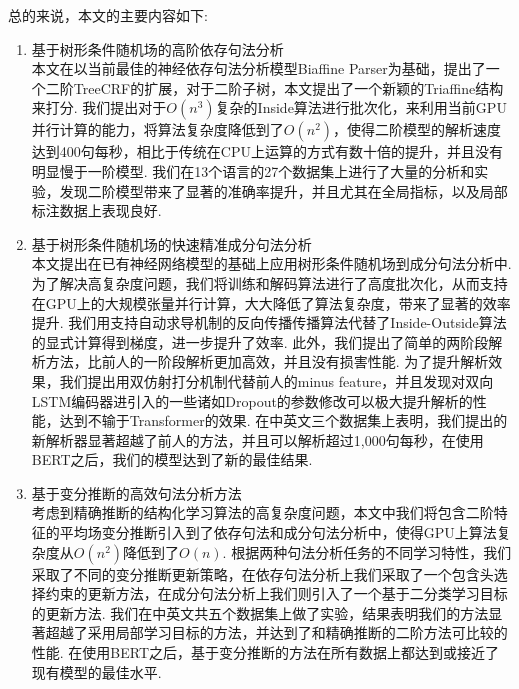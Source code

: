 总的来说，本文的主要内容如下:
\begin{enumerate}
    \item 基于树形条件随机场的高阶依存句法分析\\
          \indent 本文在以当前最佳的神经依存句法分析模型Biaffine Parser为基础，提出了一个二阶TreeCRF的扩展，对于二阶子树，本文提出了一个新颖的Triaffine结构来打分.
          我们提出对于$O(n^3)$复杂的Inside算法进行批次化，来利用当前GPU并行计算的能力，将算法复杂度降低到了$O(n^2)$，使得二阶模型的解析速度达到400句每秒，相比于传统在CPU上运算的方式有数十倍的提升，并且没有明显慢于一阶模型.
          我们在13个语言的27个数据集上进行了大量的分析和实验，发现二阶模型带来了显著的准确率提升，并且尤其在全局指标，以及局部标注数据上表现良好.
    \item 基于树形条件随机场的快速精准成分句法分析\\
          \indent 本文提出在已有神经网络模型的基础上应用树形条件随机场到成分句法分析中.
          为了解决高复杂度问题，我们将训练和解码算法进行了高度批次化，从而支持在GPU上的大规模张量并行计算，大大降低了算法复杂度，带来了显著的效率提升.
          我们用支持自动求导机制的反向传播传播算法代替了Inside-Outside算法的显式计算得到梯度，进一步提升了效率.
          此外，我们提出了简单的两阶段解析方法，比前人的一阶段解析更加高效，并且没有损害性能.
          为了提升解析效果，我们提出用双仿射打分机制代替前人的minus feature，并且发现对双向LSTM编码器进引入的一些诸如Dropout的参数修改可以极大提升解析的性能，达到不输于Transformer的效果.
          在中英文三个数据集上表明，我们提出的新解析器显著超越了前人的方法，并且可以解析超过1,000句每秒，在使用BERT之后，我们的模型达到了新的最佳结果.
    \item 基于变分推断的高效句法分析方法\\
          \indent 考虑到精确推断的结构化学习算法的高复杂度问题，本文中我们将包含二阶特征的平均场变分推断引入到了依存句法和成分句法分析中，使得GPU上算法复杂度从$O(n^2)$降低到了$O(n)$.
          根据两种句法分析任务的不同学习特性，我们采取了不同的变分推断更新策略，在依存句法分析上我们采取了一个包含头选择约束的更新方法，在成分句法分析上我们则引入了一个基于二分类学习目标的更新方法.
          我们在中英文共五个数据集上做了实验，结果表明我们的方法显著超越了采用局部学习目标的方法，并达到了和精确推断的二阶方法可比较的性能.
          在使用BERT之后，基于变分推断的方法在所有数据上都达到或接近了现有模型的最佳水平.
\end{enumerate}

